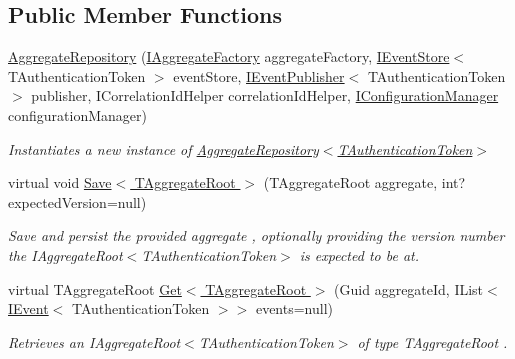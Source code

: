 \subsection*{Public Member Functions}
\begin{DoxyCompactItemize}
\item 
\hyperlink{classCqrs_1_1Domain_1_1AggregateRepository_a12a5588533a7eb2cdd061576ad53c8ac_a12a5588533a7eb2cdd061576ad53c8ac}{Aggregate\+Repository} (\hyperlink{interfaceCqrs_1_1Domain_1_1Factories_1_1IAggregateFactory}{I\+Aggregate\+Factory} aggregate\+Factory, \hyperlink{interfaceCqrs_1_1Events_1_1IEventStore}{I\+Event\+Store}$<$ T\+Authentication\+Token $>$ event\+Store, \hyperlink{interfaceCqrs_1_1Events_1_1IEventPublisher}{I\+Event\+Publisher}$<$ T\+Authentication\+Token $>$ publisher, I\+Correlation\+Id\+Helper correlation\+Id\+Helper, \hyperlink{interfaceCqrs_1_1Configuration_1_1IConfigurationManager}{I\+Configuration\+Manager} configuration\+Manager)
\begin{DoxyCompactList}\small\item\em Instantiates a new instance of \hyperlink{classCqrs_1_1Domain_1_1AggregateRepository_a12a5588533a7eb2cdd061576ad53c8ac_a12a5588533a7eb2cdd061576ad53c8ac}{Aggregate\+Repository$<$\+T\+Authentication\+Token$>$} \end{DoxyCompactList}\item 
virtual void \hyperlink{classCqrs_1_1Domain_1_1AggregateRepository_aff9e828d19a091a4275f635bee4b3c9b_aff9e828d19a091a4275f635bee4b3c9b}{Save$<$ T\+Aggregate\+Root $>$} (T\+Aggregate\+Root aggregate, int? expected\+Version=null)
\begin{DoxyCompactList}\small\item\em Save and persist the provided {\itshape aggregate} , optionally providing the version number the I\+Aggregate\+Root$<$\+T\+Authentication\+Token$>$ is expected to be at. \end{DoxyCompactList}\item 
virtual T\+Aggregate\+Root \hyperlink{classCqrs_1_1Domain_1_1AggregateRepository_a0e55881812d463129df34189d29544b6_a0e55881812d463129df34189d29544b6}{Get$<$ T\+Aggregate\+Root $>$} (Guid aggregate\+Id, I\+List$<$ \hyperlink{interfaceCqrs_1_1Events_1_1IEvent}{I\+Event}$<$ T\+Authentication\+Token $>$$>$ events=null)
\begin{DoxyCompactList}\small\item\em Retrieves an I\+Aggregate\+Root$<$\+T\+Authentication\+Token$>$ of type {\itshape T\+Aggregate\+Root} . \end{DoxyCompactList}\item 
$$
\end{DoxyCompactItemize}
